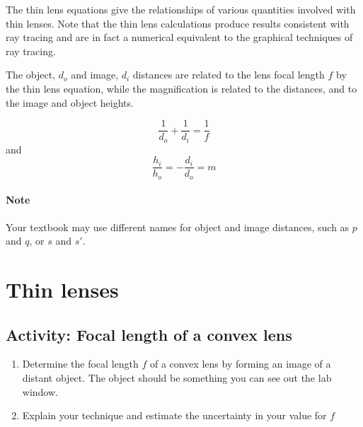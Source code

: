 The thin lens equations give the relationships of various quantities involved with thin lenses.  Note that the thin lens calculations produce results consistent with ray tracing and are in fact a numerical equivalent to the graphical techniques of ray tracing.

The object, $d_o$ and image, $d_i$ distances are related to the lens focal length $f$ by the thin lens equation, while the magnification is related to the distances, and to the image and object heights.

\begin{equation} \label{e:thin}
	\frac{1}{d_o} + \frac{1}{d_i} = \frac{1}{f}
\end{equation}
and
\begin{equation} \label{e:thinmag}
	\frac{h_i}{h_o} = -\frac{d_i}{d_o} = m
\end{equation}

\paragraph{Note} Your textbook may use different names for object and image distances, such as $p$ and $q$, or $s$ and $s'$.


\section {Thin lenses}
\subsection{Activity: Focal length of a convex lens}\label{s:focal}
\begin{enumerate}
	\item Determine the focal length $f$ of a convex lens by forming an image of a distant object.  The object should be something you can see out the lab window.
	\item Explain your technique and estimate the uncertainty in your value for $f$
\end{enumerate}

